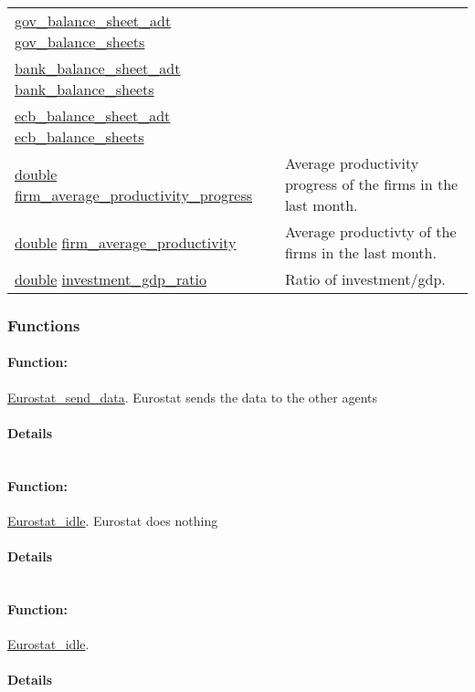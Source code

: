\documentclass[a4paper,11pt]{article}
\begin{document}
\begin{center}
\begin{longtable}[H!]{ll}
\url{gov_balance_sheet_adt} \url{gov_balance_sheets} & \parbox{10cm}{} \\
\url{bank_balance_sheet_adt} \url{bank_balance_sheets} & \parbox{10cm}{} \\
\url{ecb_balance_sheet_adt} \url{ecb_balance_sheets} & \parbox{10cm}{} \\
\url{double} \url{firm_average_productivity_progress} & \parbox{10cm}{Average productivity progress of the firms in the last month.} \\
\url{double} \url{firm_average_productivity} & \parbox{10cm}{Average productivty of the firms in the last month.} \\
\url{double} \url{investment_gdp_ratio} & \parbox{10cm}{Ratio of investment/gdp.} \\
\end{longtable}
\end{center}
\subsubsection{Functions}
\paragraph{Function:}\url{Eurostat_send_data}.
Eurostat sends the data to the other agents
\paragraph{Details}
\begin{verbatim}
\end{verbatim}
\paragraph{Function:}\url{Eurostat_idle}.
Eurostat does nothing
\paragraph{Details}
\begin{verbatim}
\end{verbatim}
\paragraph{Function:}\url{Eurostat_idle}.

\paragraph{Details}
\begin{verbatim}
\end{verbatim}
\end{document}
